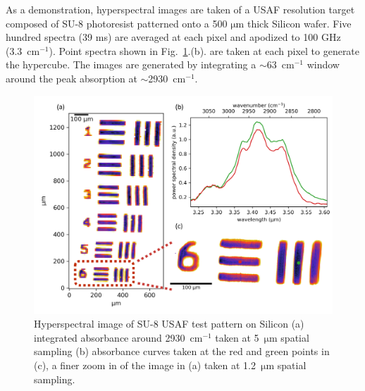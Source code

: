 \documentclass{optica-article}
\begin{document}
As a demonstration, hyperspectral images are taken of a USAF resolution target composed of SU-8 photoresist patterned onto a 500 $\mathrm{\mu m}$ thick Silicon wafer. Five hundred spectra (39 ms) are averaged at each pixel and apodized to 100 GHz (\mbox{3.3 $\mathrm{cm^{-1}}$}). Point spectra shown in \mbox{Fig. \ref{fig:su8}.(b).} are taken at each pixel to generate the hypercube. The images are generated by integrating a \mbox{$\sim$63 $\mathrm{cm^{-1}}$} window around the peak absorption at \mbox{$\sim$2930 $\mathrm{cm^{-1}}$}. 


\begin{figure}[h]
    \centering
    \includegraphics[width=\linewidth]{su8_image.png}
    \caption{Hyperspectral image of SU-8 USAF test pattern on Silicon (a) integrated absorbance around \mbox{2930 $\mathrm{cm^{-1}}$} taken at \mbox{5 $\mathrm{\mu m}$} spatial sampling (b) absorbance curves taken at the red and green points in (c), a finer zoom in of the image in (a) taken at \mbox{1.2 $\mathrm{\mu m}$} spatial sampling.}
    \label{fig:su8}
\end{figure}
\end{document}

